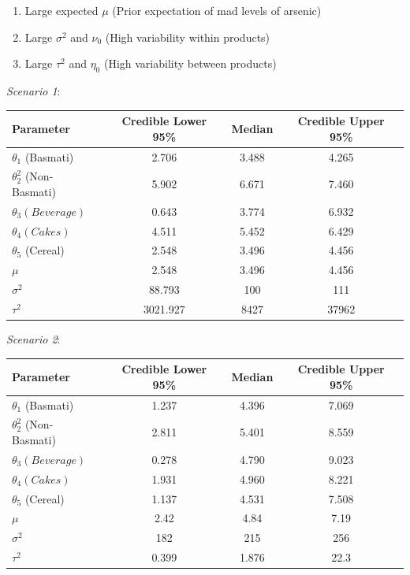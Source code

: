 \documentclass[]{article}
\begin{document}
\begin{enumerate}
  \item Large expected $\mu$ (Prior expectation of mad levels of arsenic)
  \item Large $\sigma^2$ and $\nu_0$ (High variability within products)
  \item Large $\tau^2$ and $\eta_0$ (High variability between products)
\end{enumerate}

\textit{Scenario 1}:

\begin{center}
  \begin{tabular}{l c c c}
  \hline Parameter & Credible Lower 95\% & Median & Credible Upper 95\%  \\ \hline
    $\theta_1$ (Basmati)&2.706&3.488&4.265\\
    $\theta_2^2$ (Non-Basmati)&5.902&6.671&7.460\\
    $\theta_3 (Beverage)$&0.643&3.774&6.932\\
    $\theta_4 (Cakes)$&4.511&5.452&6.429\\
    $\theta_5$ (Cereal)&2.548&3.496&4.456\\
    $\mu$ &2.548&3.496&4.456\\
    $\sigma^2$ &88.793&100&111\\
    $\tau^2$ &3021.927&8427&37962\\ \hline
  \end{tabular}
\end{center}

\textit{Scenario 2}:

\begin{center}
  \begin{tabular}{l c c c}
  \hline Parameter & Credible Lower 95\% & Median & Credible Upper 95\% \\ \hline
    $\theta_1$ (Basmati)& 1.237 & 4.396 & 7.069\\
    $\theta_2^2$ (Non-Basmati)& 2.811 & 5.401 & 8.559 \\
    $\theta_3 (Beverage)$& 0.278 & 4.790 & 9.023 \\
    $\theta_4 (Cakes)$& 1.931 & 4.960 & 8.221\\
    $\theta_5$ (Cereal)& 1.137 & 4.531 & 7.508\\
    $\mu$ &2.42 & 4.84 & 7.19\\
    $\sigma^2$ &182 & 215& 256\\
    $\tau^2$ &0.399 & 1.876 & 22.3\\ \hline

  \end{tabular}
\end{center}
\end{document}
